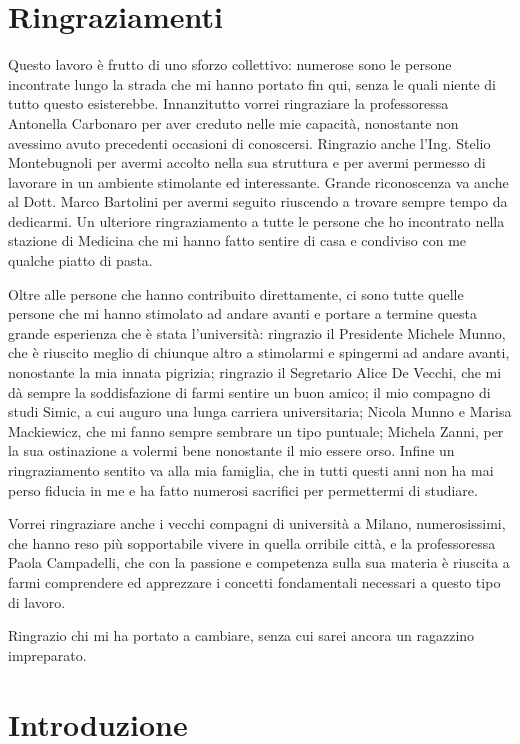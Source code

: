 \chapter*{Ringraziamenti}
Questo lavoro \`e frutto di uno sforzo collettivo: numerose sono le persone
incontrate lungo la strada che mi hanno portato fin qui, senza le quali niente
di tutto questo esisterebbe. Innanzitutto vorrei ringraziare la professoressa
Antonella Carbonaro per aver creduto nelle mie capacit\`a, nonostante non
avessimo avuto precedenti occasioni di conoscersi. Ringrazio anche l'Ing. Stelio
Montebugnoli per avermi accolto nella sua struttura e per avermi permesso di
lavorare in un ambiente stimolante ed interessante. Grande riconoscenza va anche
al Dott. Marco Bartolini per avermi seguito riuscendo a trovare sempre tempo da
dedicarmi. Un ulteriore ringraziamento a tutte le persone che ho incontrato
nella stazione di Medicina che mi hanno fatto sentire di casa e condiviso con me
qualche piatto di pasta.

Oltre alle persone che hanno contribuito direttamente, ci sono tutte quelle
persone che mi hanno stimolato ad andare avanti e portare a termine questa
grande esperienza che \`e stata l'universit\`a: ringrazio il Presidente Michele
Munno, che \`e riuscito meglio di chiunque altro a stimolarmi e spingermi ad
andare avanti, nonostante la mia innata pigrizia; ringrazio il Segretario Alice
De Vecchi, che mi d\`a sempre la soddisfazione di farmi sentire un buon amico;
il mio compagno di studi Simic, a cui auguro una lunga carriera universitaria;
Nicola Munno e Marisa Mackiewicz, che mi fanno sempre sembrare un tipo puntuale;
Michela Zanni, per la sua ostinazione a volermi bene nonostante il mio essere
orso. Infine un ringraziamento sentito va alla mia famiglia, che in tutti questi
anni non ha mai perso fiducia in me e ha fatto numerosi sacrifici per
permettermi di studiare.

Vorrei ringraziare anche i vecchi compagni di universit\`a a Milano,
numerosissimi, che hanno reso pi\`u sopportabile vivere in quella orribile
citt\`a, e la professoressa Paola Campadelli, che con la passione e competenza
sulla sua materia \`e riuscita a farmi comprendere ed apprezzare i concetti
fondamentali necessari a questo tipo di lavoro.

Ringrazio chi mi ha portato a cambiare, senza cui sarei ancora un ragazzino
impreparato.

\chapter*{Introduzione}
\label{intro}


